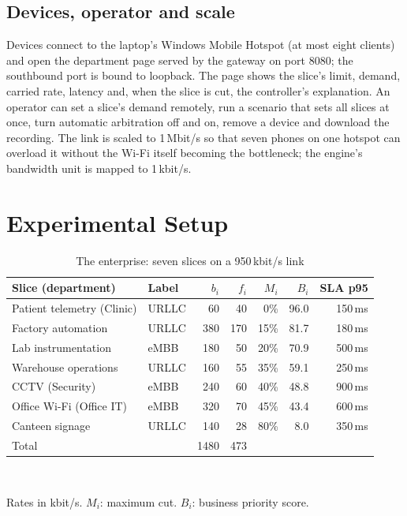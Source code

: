 \documentclass[conference]{IEEEtran}
\newcommand{\kbps}{\,kbit/s}
\begin{document}
\subsection{Devices, operator and scale}
Devices connect to the laptop's Windows Mobile Hotspot (at most eight clients) and open the department page served by the gateway on port 8080; the southbound port is bound to loopback. The page shows the slice's limit, demand, carried rate, latency and, when the slice is cut, the controller's explanation. An operator can set a slice's demand remotely, run a scenario that sets all slices at once, turn automatic arbitration off and on, remove a device and download the recording. The link is scaled to 1\,Mbit/s so that seven phones on one hotspot can overload it without the Wi-Fi itself becoming the bottleneck; the engine's bandwidth unit is mapped to 1\kbps.

\section{Experimental Setup}
\label{sec:setup}

\begin{table}[t]
\caption{The enterprise: seven slices on a 950\kbps{} link}
\label{tab:slices}
\centering
\footnotesize
\setlength{\tabcolsep}{3pt}
\begin{tabular}{@{}llrrrrr@{}}
\toprule
Slice (department) & Label & $b_i$ & $f_i$ & $M_i$ & $B_i$ & SLA p95 \\
\midrule
Patient telemetry (Clinic) & URLLC & 60 & 40 & 0\% & 96.0 & 150\,ms \\
Factory automation & URLLC & 380 & 170 & 15\% & 81.7 & 180\,ms \\
Lab instrumentation & eMBB & 180 & 50 & 20\% & 70.9 & 500\,ms \\
Warehouse operations & URLLC & 160 & 55 & 35\% & 59.1 & 250\,ms \\
CCTV (Security) & eMBB & 240 & 60 & 40\% & 48.8 & 900\,ms \\
Office Wi-Fi (Office IT) & eMBB & 320 & 70 & 45\% & 43.4 & 600\,ms \\
Canteen signage & URLLC & 140 & 28 & 80\% & 8.0 & 350\,ms \\
\midrule
Total & & 1480 & 473 & & & \\
\bottomrule
\end{tabular}
\\[2pt]\raggedright\scriptsize Rates in kbit/s. $M_i$: maximum cut. $B_i$: business priority score.
\end{table}
\end{document}
